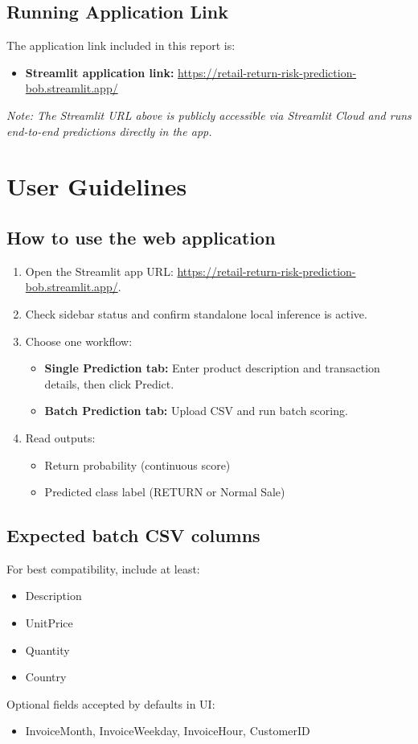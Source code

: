 \documentclass[11pt,a4paper]{article}
\newcommand{\streamliturl}{https://retail-return-risk-prediction-bob.streamlit.app/}
\newcommand{\publicappurl}{https://retail-return-risk-prediction-bob.streamlit.app/}
\begin{document}
\subsection{Running Application Link}
The application link included in this report is:
\begin{itemize}[leftmargin=1.5em]
    \item \textbf{Streamlit application link:} \url{\publicappurl}
\end{itemize}

\textit{Note: The Streamlit URL above is publicly accessible via Streamlit Cloud and runs end-to-end predictions directly in the app.}

\section{User Guidelines}
\subsection{How to use the web application}
\begin{enumerate}[leftmargin=1.7em]
    \item Open the Streamlit app URL: \url{\streamliturl}.
    \item Check sidebar status and confirm standalone local inference is active.
    \item Choose one workflow:
    \begin{itemize}[leftmargin=1.5em]
        \item \textbf{Single Prediction tab:} Enter product description and transaction details, then click Predict.
        \item \textbf{Batch Prediction tab:} Upload CSV and run batch scoring.
    \end{itemize}
    \item Read outputs:
    \begin{itemize}[leftmargin=1.5em]
        \item Return probability (continuous score)
        \item Predicted class label (RETURN or Normal Sale)
    \end{itemize}
\end{enumerate}

\subsection{Expected batch CSV columns}
For best compatibility, include at least:
\begin{itemize}[leftmargin=1.5em]
    \item Description
    \item UnitPrice
    \item Quantity
    \item Country
\end{itemize}
Optional fields accepted by defaults in UI:
\begin{itemize}[leftmargin=1.5em]
    \item InvoiceMonth, InvoiceWeekday, InvoiceHour, CustomerID
\end{itemize}
\end{document}
